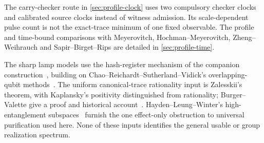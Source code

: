 The carry-checker route in \cref{sec:profile-clock} uses two compulsory checker clocks and calibrated source clocks instead of witness admission. Its scale-dependent pulse count is not the exact-trace minimum of one fixed observable. The profile and time-bound comparisons with Meyerovitch, Hochman--Meyerovitch, Zheng--Weihrauch and Sapir--Birget--Rips are detailed in \cref{sec:profile-time}.

The sharp lamp models use the hash-register mechanism of the companion construction~\cite[Proposition~9.4]{DM-game}, building on Chao--Reichardt--Sutherland--Vidick's overlapping-qubit methods~\cite{CRSV17,CRSV18}. The uniform canonical-trace rationality input is Zalesskii's theorem, with Kaplansky's positivity distinguished from rationality; Burger--Valette give a proof and historical account~\cite{BV98}. Hayden--Leung--Winter's high-entanglement subspaces~\cite{HLW06} furnish the one effect-only obstruction to universal purification used here. None of these inputs identifies the general usable or group realization spectrum.
